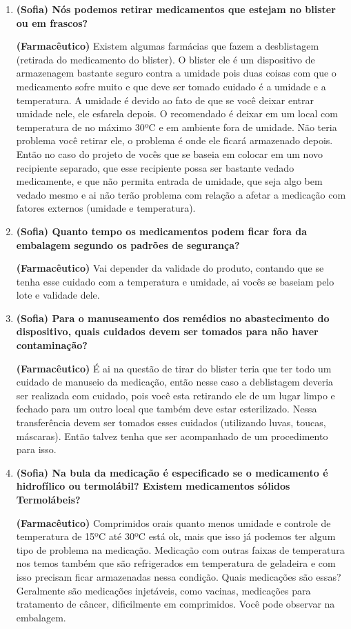 \begin{apendicesenv}
\begin{enumerate}
\item \textbf{(Sofia) Nós podemos retirar medicamentos que estejam no blister ou em frascos?}

\textbf{(Farmacêutico)}  Existem algumas farmácias que fazem a desblistagem (retirada do medicamento do blister). O blister ele é um dispositivo de armazenagem bastante seguro contra a umidade pois duas coisas com que o medicamento sofre muito e que deve ser tomado cuidado é a umidade e a temperatura. A umidade é devido ao fato de que se você deixar entrar umidade nele, ele esfarela depois. O recomendado é deixar em um local com temperatura de no máximo 30ºC e em ambiente fora de umidade. Não teria problema você retirar ele, o problema é onde ele ficará armazenado depois. Então no caso do projeto de vocês que se baseia em colocar em um novo recipiente separado, que esse recipiente possa ser bastante vedado medicamente, e que não permita entrada de umidade, que seja algo bem vedado mesmo e ai não terão problema com relação a afetar a medicação com fatores externos (umidade e temperatura). 

\item \textbf{(Sofia) Quanto tempo os medicamentos podem ficar fora da embalagem segundo os padrões de segurança?}

\textbf{(Farmacêutico)} Vai depender da validade do produto, contando que se tenha esse cuidado com a temperatura e umidade, ai vocês se baseiam pelo lote e validade dele.  

\item \textbf{ (Sofia) Para o manuseamento dos remédios no abastecimento do dispositivo, quais cuidados devem ser tomados para não haver contaminação?}

\textbf{(Farmacêutico)} É ai na questão de tirar do blister teria que ter todo um cuidado de manuseio da medicação, então nesse caso a deblistagem deveria ser realizada com cuidado, pois você esta retirando ele de um lugar limpo e fechado para um outro local que também deve estar esterilizado. Nessa transferência devem ser tomados esses cuidados (utilizando luvas, toucas, máscaras). Então talvez tenha que ser acompanhado de um procedimento para isso.

\item \textbf{(Sofia) Na bula da medicação é especificado se o medicamento é hidrofílico ou termolábil? Existem medicamentos sólidos Termolábeis?}

\textbf{(Farmacêutico)} Comprimidos orais quanto menos umidade e controle de temperatura de 15ºC até 30ºC está ok, mais que isso já podemos ter algum tipo de problema na medicação. Medicação com outras faixas de temperatura nos temos também que são refrigerados em temperatura de geladeira e com isso precisam ficar armazenadas nessa condição. Quais medicações são essas? Geralmente são medicações injetáveis, como vacinas, medicações para tratamento de câncer, dificilmente em comprimidos. Você pode observar na embalagem.


\end{enumerate}
\end{apendicesenv}
